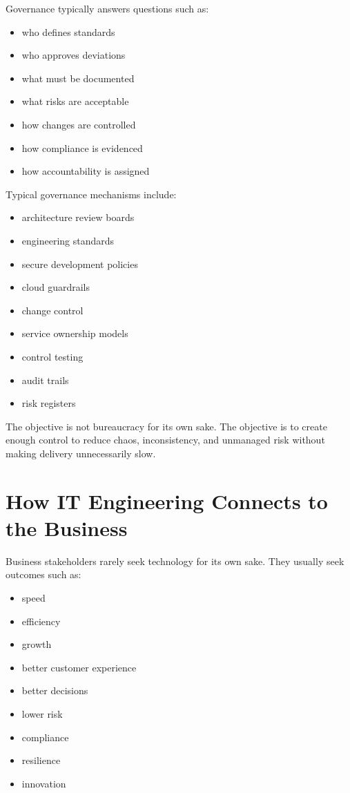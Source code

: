 \documentclass[
  british,
  letterpaper,
  DIV=11,
  numbers=noendperiod]{scrartcl}
\providecommand{\tightlist}{%
  \setlength{\itemsep}{0pt}\setlength{\parskip}{0pt}}
\begin{document}
Governance typically answers questions such as:

\begin{itemize}
\tightlist
\item
  who defines standards
\item
  who approves deviations
\item
  what must be documented
\item
  what risks are acceptable
\item
  how changes are controlled
\item
  how compliance is evidenced
\item
  how accountability is assigned
\end{itemize}

Typical governance mechanisms include:

\begin{itemize}
\tightlist
\item
  architecture review boards
\item
  engineering standards
\item
  secure development policies
\item
  cloud guardrails
\item
  change control
\item
  service ownership models
\item
  control testing
\item
  audit trails
\item
  risk registers
\end{itemize}

The objective is not bureaucracy for its own sake. The objective is to
create enough control to reduce chaos, inconsistency, and unmanaged risk
without making delivery unnecessarily slow.

\section{How IT Engineering Connects to the
Business}\label{how-it-engineering-connects-to-the-business}

Business stakeholders rarely seek technology for its own sake. They
usually seek outcomes such as:

\begin{itemize}
\tightlist
\item
  speed
\item
  efficiency
\item
  growth
\item
  better customer experience
\item
  better decisions
\item
  lower risk
\item
  compliance
\item
  resilience
\item
  innovation
\end{itemize}
\end{document}
